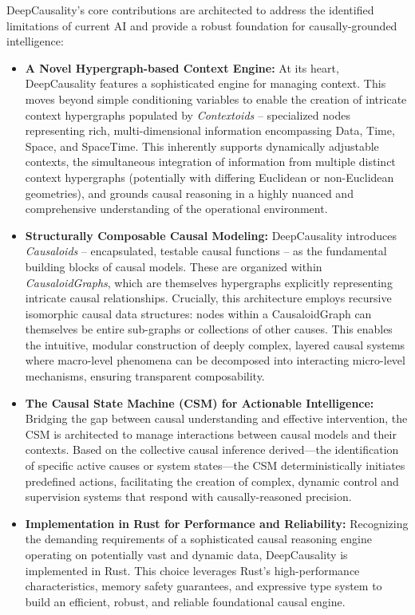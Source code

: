 DeepCausality’s core contributions are architected to address the identified limitations of current AI and provide a robust foundation for causally-grounded intelligence:
\begin{itemize}
    \item \textbf{A Novel Hypergraph-based Context Engine:} At its heart, DeepCausality features a sophisticated engine for managing context. This moves beyond simple conditioning variables to enable the creation of intricate context hypergraphs populated by \textit{Contextoids} – specialized nodes representing rich, multi-dimensional information encompassing Data, Time, Space, and SpaceTime. This inherently supports dynamically adjustable contexts, the simultaneous integration of information from multiple distinct context hypergraphs (potentially with differing Euclidean or non-Euclidean geometries), and grounds causal reasoning in a highly nuanced and comprehensive understanding of the operational environment.
    \item \textbf{Structurally Composable Causal Modeling:} DeepCausality introduces \textit{Causaloids} – encapsulated, testable causal functions – as the fundamental building blocks of causal models. These are organized within \textit{CausaloidGraphs}, which are themselves hypergraphs explicitly representing intricate causal relationships. Crucially, this architecture employs recursive isomorphic causal data structures: nodes within a CausaloidGraph can themselves be entire sub-graphs or collections of other causes. This enables the intuitive, modular construction of deeply complex, layered causal systems where macro-level phenomena can be decomposed into interacting micro-level mechanisms, ensuring transparent composability.
    \item \textbf{The Causal State Machine (CSM) for Actionable Intelligence:} Bridging the gap between causal understanding and effective intervention, the CSM is architected to manage interactions between causal models and their contexts. Based on the collective causal inference derived—the identification of specific active causes or system states—the CSM deterministically initiates predefined actions, facilitating the creation of complex, dynamic control and supervision systems that respond with causally-reasoned precision.
    \item \textbf{Implementation in Rust for Performance and Reliability:} Recognizing the demanding requirements of a sophisticated causal reasoning engine operating on potentially vast and dynamic data, DeepCausality is implemented in Rust. This choice leverages Rust’s high-performance characteristics, memory safety guarantees, and expressive type system to build an efficient, robust, and reliable foundational causal engine.
    
\end{itemize}

